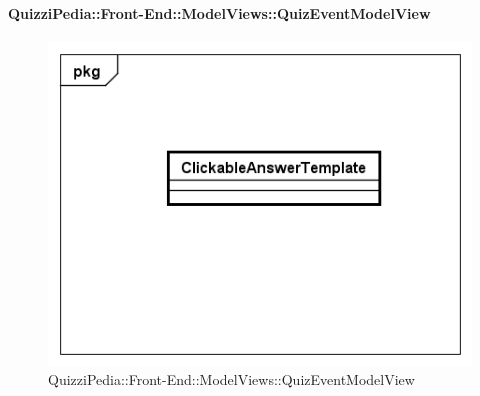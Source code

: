 						
							\paragraph{QuizziPedia::Front-End::ModelViews::QuizEventModelView}
							
							\label{QuizziPedia::Front-End::ModelViews::QuizEventModelView}
							
							\begin{figure}[ht]
								\centering
								\includegraphics[scale=0.5,keepaspectratio]{UML/Classi/Front-End/QuizziPedia_Front-end_Templates_ClickableAnswerTemplate.png}
								\caption{QuizziPedia::Front-End::ModelViews::QuizEventModelView}
							\end{figure} \FloatBarrier
							
